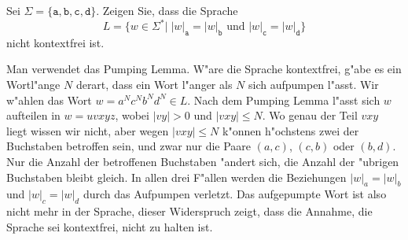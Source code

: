 Sei $\Sigma=\{\texttt{a},\texttt{b},\texttt{c},\texttt{d}\}$.
Zeigen Sie, dass die Sprache
\[
L=\{w\in\Sigma^*|\;\text{$|w|_\texttt{a}=|w|_\texttt{b}$ und $|w|_\texttt{c}=|w|_\texttt{d}$}\}
\]
nicht kontextfrei ist.

\begin{loesung}
Man verwendet das Pumping Lemma.
W"are die Sprache kontextfrei,
g"abe
es ein Wortl"ange $N$ derart, dass ein Wort l"anger als $N$ sich
aufpumpen l"asst.
Wir w"ahlen das Wort $w=a^Nc^Nb^Nd^N\in L$.
Nach dem Pumping
Lemma l"asst sich $w$ aufteilen in
$w = uvxyz$, wobei $|vy|>0$ und $|vxy|\le N$.
Wo genau der Teil
$vxy$ liegt wissen wir nicht, aber wegen $|vxy|\le N$ k"onnen
h"ochstens zwei der Buchstaben betroffen sein, und
zwar nur die Paare $(a,c)$, $(c,b)$ oder $(b,d)$.
Nur die Anzahl
der betroffenen Buchstaben "andert sich, die Anzahl der "ubrigen
Buchstaben bleibt gleich.
In allen drei F"allen werden die
Beziehungen $|w|_a=|w|_b$ und $|w|_c=|w|_d$ durch das Aufpumpen verletzt.
Das aufgepumpte Wort ist also nicht mehr in der Sprache, dieser Widerspruch
zeigt, dass die Annahme, die Sprache sei kontextfrei, nicht zu halten ist.
\end{loesung}
